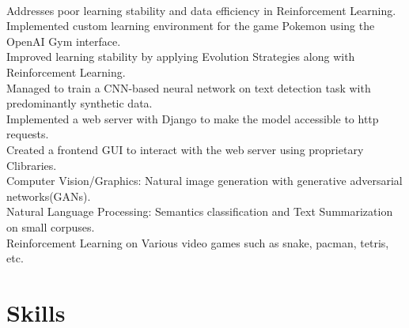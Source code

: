 \begin{itemize}[leftmargin=*]
{
    \\ Addresses poor learning stability and data efficiency in Reinforcement Learning.
    \\ Implemented custom learning environment for the game Pokemon using the OpenAI Gym interface. 
    \\ Improved learning stability by applying Evolution Strategies along with Reinforcement Learning.
}
\vspace{2pt}
{
    \\ Managed to train a CNN-based neural network on text detection task with predominantly synthetic data.
    \\ Implemented a web server with Django to make the model accessible to http requests.
    \\ Created a frontend GUI to interact with the web server using proprietary C\Plus\Plus libraries.
}
\vspace{2pt}
{
    \\ Computer Vision/Graphics: Natural image generation with generative adversarial networks(GANs).
    \\ Natural Language Processing: Semantics classification and Text Summarization on small corpuses.
    \\ Reinforcement Learning on Various video games such as snake, pacman, tetris, etc.
}
\end{itemize}
\vspace{-5pt}

\section{Skills}
\begin{itemize}[leftmargin=*]
\end{itemize}
\vspace{-5pt}




